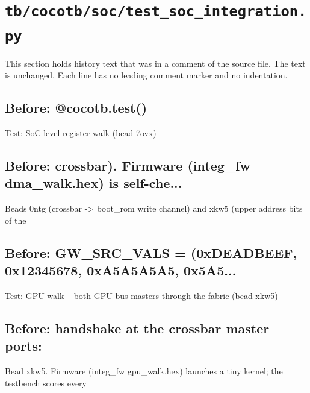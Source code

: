 \section{\texttt{tb/cocotb/soc/test\_soc\_integration.py}}\label{cr:suite:soc-test-soc-integration}

This section holds history text that was in a comment of the source file. The text is unchanged. Each line has no leading comment marker and no indentation.

\begin{record}

\subsection*{Before: @cocotb.test()}

\begin{textblock}
Test: SoC-level register walk (bead 7ovx)
\end{textblock}

\subsection*{Before: crossbar).  Firmware (integ\_fw dma\_walk.hex) is self-che...}

\begin{textblock}
Beads 0ntg (crossbar -> boot_rom write channel) and xkw5 (upper address bits of the
\end{textblock}

\subsection*{Before: GW\_SRC\_VALS = (0xDEADBEEF, 0x12345678, 0xA5A5A5A5, 0x5A5...}

\begin{textblock}
Test: GPU walk -- both GPU bus masters through the fabric (bead xkw5)
\end{textblock}

\subsection*{Before: handshake at the crossbar master ports:}

\begin{textblock}
Bead xkw5.  Firmware (integ_fw gpu_walk.hex) launches a tiny kernel; the testbench scores every
\end{textblock}

\end{record}

